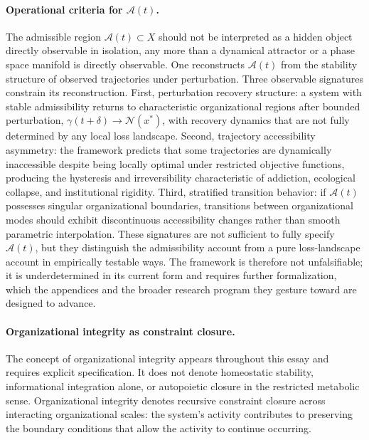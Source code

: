 \documentclass[12pt,a4paper]{report}
\theoremstyle{flyxion}
\begin{document}
\paragraph{Operational criteria for $\mathcal{A}(t)$.} The admissible region $\mathcal{A}(t) \subset X$ should not be interpreted as a hidden object directly observable in isolation, any more than a dynamical attractor or a phase space manifold is directly observable. One reconstructs $\mathcal{A}(t)$ from the stability structure of observed trajectories under perturbation. Three observable signatures constrain its reconstruction. First, perturbation recovery structure: a system with stable admissibility returns to characteristic organizational regions after bounded perturbation, $\gamma(t+\delta) \rightarrow \mathcal{N}(x^\ast)$, with recovery dynamics that are not fully determined by any local loss landscape. Second, trajectory accessibility asymmetry: the framework predicts that some trajectories are dynamically inaccessible despite being locally optimal under restricted objective functions, producing the hysteresis and irreversibility characteristic of addiction, ecological collapse, and institutional rigidity. Third, stratified transition behavior: if $\mathcal{A}(t)$ possesses singular organizational boundaries, transitions between organizational modes should exhibit discontinuous accessibility changes rather than smooth parametric interpolation. These signatures are not sufficient to fully specify $\mathcal{A}(t)$, but they distinguish the admissibility account from a pure loss-landscape account in empirically testable ways. The framework is therefore not unfalsifiable; it is underdetermined in its current form and requires further formalization, which the appendices and the broader research program they gesture toward are designed to advance.

\paragraph{Organizational integrity as constraint closure.} The concept of organizational integrity appears throughout this essay and requires explicit specification. It does not denote homeostatic stability, informational integration alone, or autopoietic closure in the restricted metabolic sense. Organizational integrity denotes recursive constraint closure across interacting organizational scales: the system's activity contributes to preserving the boundary conditions that allow the activity to continue occurring.
\end{document}
